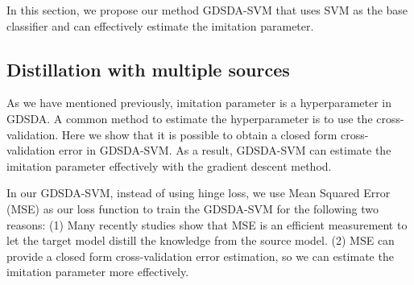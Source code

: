 In this section, we propose our method GDSDA-SVM that uses SVM as the base classifier and can effectively estimate the imitation parameter.
\subsection{Distillation with multiple sources}
As we have mentioned previously, imitation parameter is a hyperparameter in GDSDA. A common method to estimate the hyperparameter is to use the cross-validation.
Here we show that it is possible to obtain a closed form cross-validation error\cite{cawley2006leave} in GDSDA-SVM.
As a result,  GDSDA-SVM can estimate the imitation parameter effectively with the gradient descent method.

In our GDSDA-SVM, instead of using hinge loss, we use Mean Squared Error (MSE) as our loss function to train the GDSDA-SVM for the following two reasons: (1) Many recently studies \cite{ba2014deep,luo2016face,romero2014fitnets,urban2016deep} show that MSE is an efficient measurement to let the target model distill the knowledge from the source model. (2) MSE can provide a closed form cross-validation error estimation, so we can estimate the imitation parameter more effectively. 


